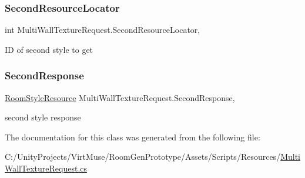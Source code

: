 \subsubsection{\texorpdfstring{Second\+Resource\+Locator}{SecondResourceLocator}}
{\footnotesize\ttfamily int Multi\+Wall\+Texture\+Request.\+Second\+Resource\+Locator\hspace{0.3cm}{\ttfamily [get]}, {}}



ID of second style to get 

\mbox{\label{class_multi_wall_texture_request_a5973e2715491e6d34270f14e1c0d33e7}} 
\subsubsection{\texorpdfstring{Second\+Response}{SecondResponse}}
{\footnotesize\ttfamily \mbox{\hyperlink{class_room_style_resource}{Room\+Style\+Resource}} Multi\+Wall\+Texture\+Request.\+Second\+Response\hspace{0.3cm}{\ttfamily [get]}, {}}



second style response 



The documentation for this class was generated from the following file\+:\begin{DoxyCompactItemize}
\item 
C\+:/\+Unity\+Projects/\+Virt\+Muse/\+Room\+Gen\+Prototype/\+Assets/\+Scripts/\+Resources/\mbox{\hyperlink{_multi_wall_texture_request_8cs}{Multi\+Wall\+Texture\+Request.\+cs}}\end{DoxyCompactItemize}
